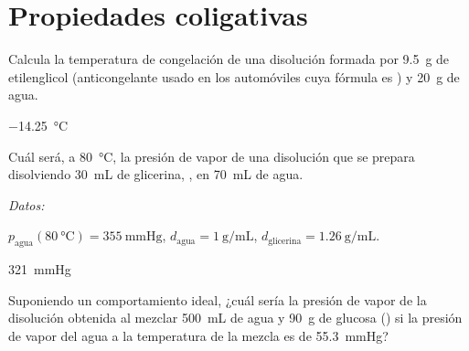 \documentclass[10pt,a5paper,twoside]{article}
\newenvironment{gexdatos}{
      \vspace{2pt}
      \noindent\small\textit{Datos:}
    }{\vspace{5pt}}
\begin{document}
\section{Propiedades coligativas}

  \begin{exercise}[
      tags    = {termodinámica, entalpía, entalpia de reacción, calor},
      topics  = {química, termoquímica, termodinámica},
      source  = {FQ 1B OXF 2015, p79, e41},
    ]
    Calcula la temperatura de congelación de una disolución formada por \SI{9.5}{\gram} de etilenglicol (anticongelante usado en los automóviles cuya fórmula es ) y \SI{20}{\gram} de agua.
  \end{exercise}

  \begin{solution}
    \SI{-14,25}{\celsius}
  \end{solution}



  \begin{exercise}[
      tags    = {termodinámica, entalpía, entalpia de reacción, calor},
      topics  = {química, termoquímica, termodinámica},
      source  = {FQ 1B SAN 2015, p94, e51},
    ]
    Cuál será, a \SI{80}{\celsius}, la presión de vapor de una disolución que se prepara disolviendo \SI{30}{\milli\liter} de glicerina, , en \SI{70}{\milli\liter} de agua.

    \begin{gexdatos}
      \( p_{\mathrm{agua}}(\SI{80}{\celsius}) = \SI{355}{\mmHg} \),
      \( d_{\mathrm{agua}} = \SI{1}{\gram\per\milli\liter} \),
      \( d_{\mathrm{glicerina}} = \SI{1.26}{\gram\per\milli\liter} \). %
    \end{gexdatos}
  \end{exercise}

  \begin{solution}
    \SI{321}{\mmHg}
  \end{solution}




  \begin{exercise}[
      tags    = {termodinámica, entalpía, entalpia de reacción, calor},
      topics  = {química, termoquímica, termodinámica},
      source  = {FQ 1B OXF 2015, p79, e44},
    ]
    Suponiendo un comportamiento ideal, ¿cuál sería la presión de vapor de la disolución obtenida al mezclar \SI{500}{\milli\liter} de agua y \SI{90}{\gram} de glucosa () si la presión de vapor del agua a la temperatura de la mezcla es de \SI{55.3}{\mmHg}?
  \end{exercise}
\end{document}
